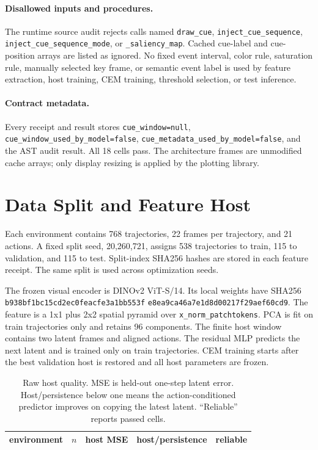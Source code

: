 \paragraph{Disallowed inputs and procedures.}
The runtime source audit rejects calls named \texttt{draw\_cue},
\texttt{inject\_cue\_sequence},
\texttt{inject\_cue\_sequence\_mode}, or
\texttt{\_saliency\_map}. Cached cue-label and cue-position arrays are listed
as ignored. No fixed event interval, color rule, saturation rule, manually
selected key frame, or semantic event label is used by feature extraction,
host training, CEM training, threshold selection, or test inference.

\paragraph{Contract metadata.}
Every receipt and result stores
\texttt{cue\_window=null},
\texttt{cue\_window\_used\_by\_model=false},
\texttt{cue\_metadata\_used\_by\_model=false}, and the AST audit result. All
18 cells pass. The architecture frames are unmodified cache arrays; only
display resizing is applied by the plotting library.

\section{Data Split and Feature Host}
\label{app:raw-host}

Each environment contains 768 trajectories, 22 frames per trajectory, and 21
actions. A fixed split seed, 20,260,721, assigns 538 trajectories to train,
115 to validation, and 115 to test. Split-index SHA256 hashes are stored in
each feature receipt. The same split is used across optimization seeds.

The frozen visual encoder is DINOv2 ViT-S/14. Its local weights have SHA256
\texttt{b938bf1bc15cd2ec0feacfe3a1bb553f}\allowbreak
\texttt{e8ea9ca46a7e1d8d00217f29aef60cd9}.
The feature is a 1x1 plus 2x2 spatial pyramid over
\texttt{x\_norm\_patchtokens}. PCA is fit on train trajectories only and
retains 96 components. The finite host window contains two latent frames and
aligned actions. The residual MLP predicts the next latent and is trained only
on train trajectories. CEM training starts after the best validation host is
restored and all host parameters are frozen.

\begin{table}[h]
\centering\scriptsize
\caption{Raw host quality. MSE is held-out one-step latent error.
Host/persistence below one means the action-conditioned predictor improves on
copying the latest latent. ``Reliable'' reports passed cells.}
\label{tab:raw-host}
\begin{tabular}{lrrrr}
\toprule
environment & $n$ & host MSE & host/persistence & reliable\\
\midrule

\end{tabular}
\end{table}

